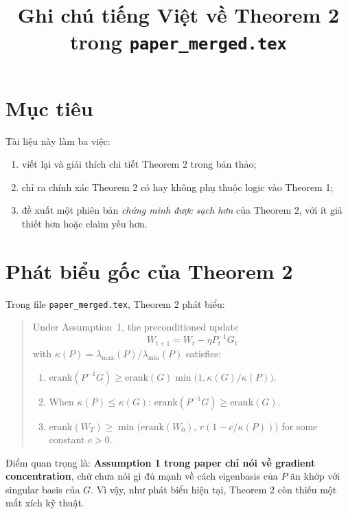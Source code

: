 \documentclass[11pt,a4paper]{article}
\title{Ghi chú tiếng Việt về Theorem 2 trong \texttt{paper\_merged.tex}}
\author{}
\date{}
\newcommand{\erank}{\mathrm{erank}}
\begin{document}
\maketitle

\section*{Mục tiêu}
Tài liệu này làm ba việc:
\begin{enumerate}[nosep]
    \item viết lại và giải thích chi tiết Theorem 2 trong bản thảo;
    \item chỉ ra chính xác Theorem 2 có hay không phụ thuộc logic vào Theorem 1;
    \item đề xuất một phiên bản \emph{chứng minh được sạch hơn} của Theorem 2, với ít giả thiết hơn hoặc claim yếu hơn.
\end{enumerate}

\section*{Phát biểu gốc của Theorem 2}
Trong file \texttt{paper\_merged.tex}, Theorem 2 phát biểu:
\begin{quote}
Under Assumption~1, the preconditioned update
\[
W_{t+1}=W_t-\eta P_t^{-1}G_t
\]
with $\kappa(P)=\lambda_{\max}(P)/\lambda_{\min}(P)$ satisfies:
\begin{enumerate}[nosep]
    \item $\erank(P^{-1}G)\ge \erank(G)\min\!\bigl(1,\kappa(G)/\kappa(P)\bigr)$.
    \item When $\kappa(P)\le \kappa(G)$: $\erank(P^{-1}G)\ge \erank(G)$.
    \item $\erank(W_T)\ge \min\!\bigl(\erank(W_0),\, r(1-c/\kappa(P))\bigr)$ for some constant $c>0$.
\end{enumerate}
\end{quote}

\noindent
Điểm quan trọng là: \textbf{Assumption 1 trong paper chỉ nói về gradient concentration}, chứ chưa nói gì đủ mạnh về cách eigenbasis của $P$ ăn khớp với singular basis của $G$. Vì vậy, như phát biểu hiện tại, Theorem 2 còn thiếu một mắt xích kỹ thuật.
\end{document}
